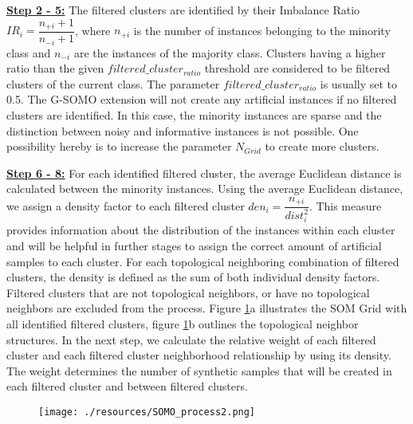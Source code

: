 \documentclass[parskip=full]{scrartcl}
\begin{document}
\textbf{\underline{Step 2 - 5:}} The filtered clusters are identified by their Imbalance Ratio 
$IR_{i} = \dfrac{n_{+i} +1}{n_{-i} +1}$, where $n_{+i}$ is the number of instances belonging to the 
minority class and $n_{-i}$ are the instances of the majority class. Clusters having a higher ratio 
than the given $filtered\_cluster_{ratio}$ threshold are considered to be filtered clusters of the 
current class. The parameter $filtered\_cluster_{ratio}$ is usually set to 0.5. The G-SOMO extension 
will not create any artificial instances if no filtered clusters are identified. In this case, the 
minority instances are sparse and the distinction between noisy and informative instances is not 
possible. One possibility hereby is to increase the parameter $N_{Grid}$ to create more clusters. 

\textbf{\underline{Step 6 - 8:}} For each identified filtered cluster, the average Euclidean distance 
is calculated between the minority instances. Using the average Euclidean distance, we assign a 
density factor to each filtered cluster $den_{i} = \dfrac{n_{+i}}{dist_{i}^2}$. This measure provides 
information about the distribution of the instances within each cluster and will be helpful in further 
stages to assign the correct amount of artificial samples to each cluster. For each topological 
neighboring combination of filtered clusters, the density is defined as the sum of both individual 
density factors. Filtered clusters that are not topological neighbors, or have no topological neighbors 
are excluded from the process. Figure \ref{fig:Somo_Overview}a illustrates the SOM Grid with all identified 
filtered clusters, figure \ref{fig:Somo_Overview}b outlines the topological neighbor structures. In the 
next step, we calculate the relative weight of each filtered cluster and each filtered cluster neighborhood 
relationship by using its density. The weight determines the number of synthetic samples that will be 
created in each filtered cluster and between filtered clusters. 

\begin{figure}[H]
	\centering
	\texttt{[image: ./resources/SOMO\_process2.png]}
	\label{fig:Somo_Overview}
\end{figure}
\end{document}
